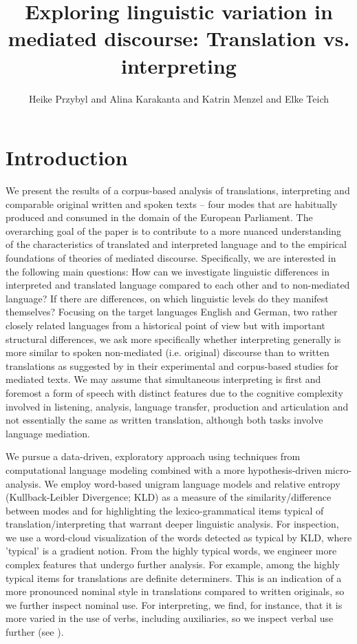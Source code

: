 \documentclass[output=paper,colorlinks,citecolor=brown]{langscibook}
\author{Heike Przybyl\affiliation{Saarland University} and Alina Karakanta\affiliation{Fondazione Bruno Kessler; University of Trento} and Katrin Menzel\affiliation{Saarland University} and Elke Teich\affiliation{Saarland University}}
\title[Exploring linguistic variation in mediated discourse]{Exploring linguistic variation in mediated discourse: Translation vs. interpreting}
\begin{document}
\maketitle
 
\section{Introduction}
We present the results of a corpus-based analysis of translations, interpreting and comparable original written and spoken texts -- four modes that are habitually produced and consumed in the domain of the European Parliament. The overarching goal of the paper is to contribute to a more nuanced understanding of the characteristics of translated and interpreted language and to the empirical foundations of theories of mediated discourse. Specifically, we are interested in the following main questions: How can we investigate linguistic differences in interpreted and translated language compared to each other and to non-mediated language? If there are differences, on which linguistic levels do they manifest themselves? Focusing on the target languages English and German, two rather closely related languages from a historical point of view but with important structural differences, we ask more specifically whether interpreting generally is more similar to spoken non-mediated (i.e. original) discourse than to written translations as suggested by \citet{ShlesingerOrdan2012} in their experimental and corpus-based studies for mediated texts. We may assume that simultaneous interpreting is first and foremost a form of speech with distinct features due to the cognitive complexity involved in listening, analysis, language transfer, production and articulation and not essentially the same as written translation, although both tasks involve language mediation.

We pursue a data-driven, exploratory approach using techniques from computational language modeling combined with a more hypothesis-driven micro-analysis. We employ word-based unigram language models and relative entropy (Kullback-Leibler Divergence; KLD) as a measure of the similarity/difference between modes and for highlighting the lexico-grammatical items typical of translation/interpreting that warrant deeper linguistic analysis. For inspection, we use a word-cloud visualization of the words detected as typical by KLD, where 'typical' is a gradient notion. From the highly typical words, we engineer more complex features that undergo further analysis. For example, among the highly typical items for translations are definite determiners. This is an indication of a more pronounced nominal style in translations compared to written originals, so we further inspect nominal use. For interpreting, we find, for instance, that it is more varied in the use of verbs, including auxiliaries, so we inspect verbal use further (see ). 
\end{document}
